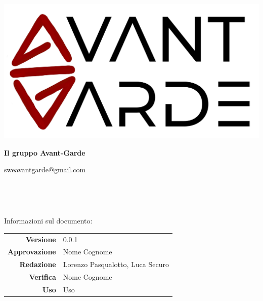     \begin{titlepage}
        \begin{center}
            \includegraphics[width=\textwidth]{logo+scritta.png}

            \vspace{0.5cm}
            {\huge \textbf{Il gruppo Avant-Garde}}

            \vspace{0.4cm}
            \large{sweavantgarde@gmail.com}

            \vspace{1.5cm}
            \hrulefill\\
            \vspace{0.2cm}
            
            \textbf{\titoloDocumento}\\
            \vspace{0.1cm}
            \hrulefill

            \vfill
            Informazioni sul documento:\\
            \vspace{0.3cm}
                \begin{tabular}{ r | l }
                    \textbf{Versione} & 0.0.1\\ %
                    \textbf{Approvazione} & Nome Cognome\\ %
                    \textbf{Redazione} & Lorenzo Pasqualotto, Luca Securo\\ %
                    \textbf{Verifica} & Nome Cognome\\ %
                    \textbf{Uso} & Uso\\ %
                \end{tabular}
        \end{center}
    \end{titlepage}
\restoregeometry